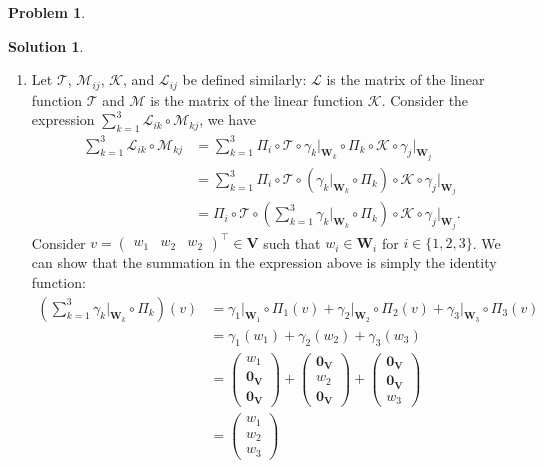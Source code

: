 \documentclass{book}
\theoremstyle{definition}
\newtheorem*{prob*}{Problem}
\newtheorem*{sln*}{Solution}
\newcommand{\V}{\mathbf{V}}
\newcommand{\W}{\mathbf{W}}
\newcommand{\lag}{\mathcal{L}}
\newcommand{\M}{\mathcal{M}}
\newcommand{\K}{\mathcal{K}}
\newcommand{\T}{\mathcal{T}}
\begin{document}
\begin{prob*}
\begin{sln*}
\begin{enumerate}
\begin{enumerate}
			\item Let $\T$, $\M_{ij}$, $\K$, and $\lag_{ij}$ be defined similarly: $\lag$ is the matrix of the linear function $\T$ and $\M$ is the matrix of the linear function $\K$. Consider the expression $\sum^3_{k=1}\lag_{ik}\circ \M_{kj}$, we have
			\begin{align*}
			\sum^3_{k=1} \lag_{ik} \circ \M_{kj} 
			&= \sum^3_{k=1}\Pi_i \circ \T \circ \gamma_k\bigg\vert_{\W_k} \circ \Pi_k \circ \K \circ \gamma_j\bigg\vert_{\W_j}\\
			&= \sum^3_{k=1} \Pi_i \circ \T \circ \left(\gamma_k\bigg\vert_{\W_k} \circ \Pi_k \right) \circ \K \circ \gamma_j\bigg\vert_{\W_j}\\
			&= \Pi_i \circ \T \circ \left(\sum_{k=1}^3 \gamma_k\bigg\vert_{\W_k} \circ \Pi_k \right) \circ \K \circ \gamma_j\bigg\vert_{\W_j}.
			\end{align*}
			Consider $v = \begin{pmatrix}w_1 & w_2 & w_2\end{pmatrix}^\top \in \V$ such that $w_i \in \W_i$ for $i\in \{1,2,3\}$. We can show that the summation in the expression above is simply the identity function:
			\begin{align*}
			\left(\sum_{k=1}^3 \gamma_k\bigg\vert_{\W_k} \circ \Pi_k \right)(v) 
			&=
			\gamma_1\bigg\vert_{\W_1} \circ \Pi_1(v) + \gamma_2\bigg\vert_{\W_2} \circ \Pi_2(v) + \gamma_3\bigg\vert_{\W_3} \circ \Pi_3(v)\\
			&= \gamma_1(w_1) + \gamma_2(w_2) + \gamma_3(w_3)\\
			&=\begin{pmatrix}
			w_1\\\mathbf{0}_\V \\ \mathbf{0}_\V
			\end{pmatrix} + \begin{pmatrix}
			\mathbf{0}_\V\\ w_2\\ \mathbf{0}_\V
			\end{pmatrix} + \begin{pmatrix}
			\mathbf{0}_\V \\ \mathbf{0}_\V \\ w_3
			\end{pmatrix}\\
			&=
			\begin{pmatrix}
			w_1\\w_2\\w_3
			\end{pmatrix}\\

\end{align*}
\end{enumerate}
\end{enumerate}
\end{sln*}
\end{prob*}
\end{document}
